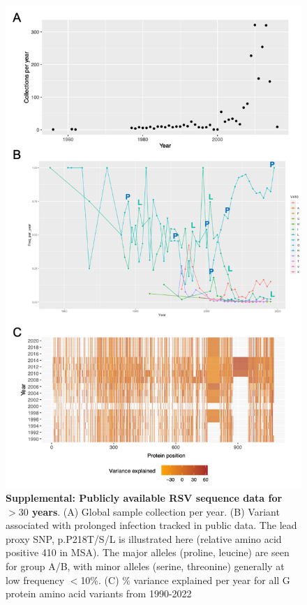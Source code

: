 \documentclass{article} %
\begin{document}
\begin{figure}[ht] \hspace{-0.5cm} \begin{center}
    \includegraphics[scale=0.6]{S2}
	\caption{\textbf{Supplemental: Publicly available RSV sequence data for $>30$ years}. (A) Global sample collection per year. (B) Variant associated with prolonged infection tracked in public data. The lead proxy SNP, p.P218T/S/L is illustrated here (relative amino acid positive 410 in MSA). The major alleles (proline, leucine) are seen for group A/B, with minor alleles (serine, threonine) generally at low frequency $<$10\%.
	(C) \% variance explained per year for all G protein amino acid variants from 1990-2022} 
	\label{fig:S2} \end{center}
\end{figure}
\end{document}
